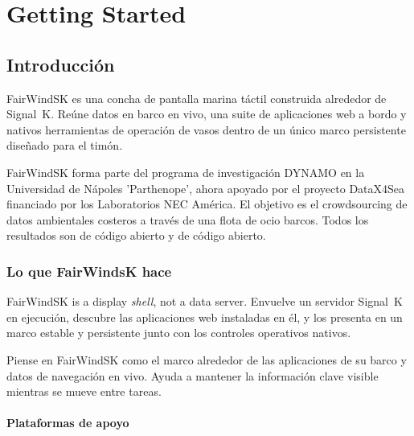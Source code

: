 \part{Getting Started}

\chapter{Introducción}

FairWindSK es una concha de pantalla marina táctil construida alrededor de Signal~K.
Reúne datos en barco en vivo, una suite de aplicaciones web a bordo y nativos
herramientas de operación de vasos dentro de un único marco persistente diseñado para el timón.

\begin{notebox}
FairWindSK forma parte del programa de investigación DYNAMO en la Universidad de Nápoles
'Parthenope', ahora apoyado por el proyecto DataX4Sea financiado por los Laboratorios NEC
América.
El objetivo es el crowdsourcing de datos ambientales costeros a través de una flota de ocio
barcos.
Todos los resultados son de código abierto y de código abierto.
\end{notebox}

\section{Lo que FairWindsK hace}

FairWindSK is a display \emph{shell}, not a data server.
Envuelve un servidor Signal~K en ejecución, descubre las aplicaciones web instaladas en él,
y los presenta en un marco estable y persistente junto con los controles operativos nativos.

Piense en FairWindSK como el marco alrededor de las aplicaciones de su barco y datos de navegación en vivo.
Ayuda a mantener la información clave visible mientras se mueve entre tareas.

\subsection{Plataformas de apoyo}

